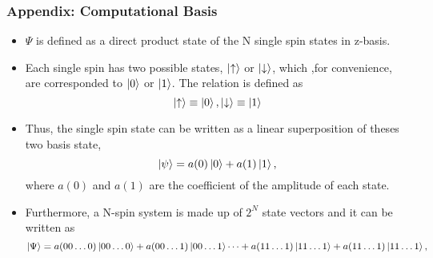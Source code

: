 \documentclass{beamer}
\begin{document}
\begin{frame}
	\frametitle{Appendix: Computational Basis}
	\begin{itemize}
		\item $\Psi$ is defined as a direct product state of the N single spin states in z-basis.
		
		\item Each single spin has two possible states, $\ket{\uparrow}$ or $\ket{\downarrow}$, which ,for convenience, are corresponded to $\ket{0}$ or $\ket{1}$. The relation is defined as 	
		\begin{equation*}
		\ket{\uparrow}\equiv \ket{0}, \ket{\downarrow} \equiv \ket{1}
		\end{equation*}
		
		\item 
		Thus, the single spin state can be written as a linear superposition of theses two basis state, 	
		\begin{equation*}
		\ket{\psi} = a(0)\ket{0} + a(1)\ket{1},
		\end{equation*}
		where $a(0)$ and $a(1)$ are the coefficient of the amplitude of each state.
		
		\item Furthermore, a N-spin system is made up of $2^N$ state vectors and it can be written as 	
		\begin{equation*}
		\label{psi_in_compuationalbasis}
		\ket{\Psi} = a(00\dots0)\ket{00\dots0}+a(00\dots1)\ket{00\dots1}\cdots +a(11\dots1)\ket{11\dots1}+a(11\dots1)\ket{11\dots1},
		\end{equation*}
		
	\end{itemize}
	
\end{frame}
\end{document}
